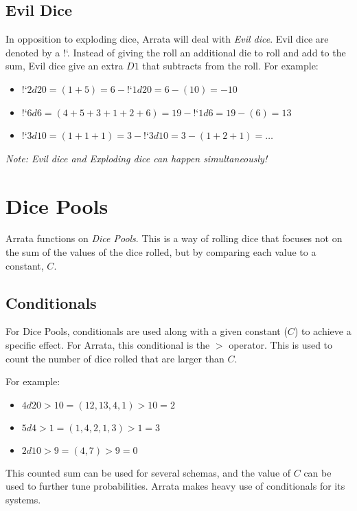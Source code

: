 \documentclass[../main.tex]{subfiles}
\begin{document}
    \subsection{Evil Dice}

    In opposition to exploding dice, Arrata will deal with {\em Evil dice}. Evil dice are denoted by a !`. Instead of giving the roll an additional die to roll and add to the sum, Evil dice give an extra $D1$ that subtracts from the roll. For example:

    \begin{itemize}
        \item!`$2d20 = (1 + 5) = 6 - $!`$1d20 = 6 - (10) = -10$
        \item!`$6d6 = (4 + 5 + 3 + 1 + 2 + 6) = 19 - $!`$1d6 = 19 - (6) = 13$
        \item!`$3d10 = (1 + 1 + 1) = 3 - $!`$3d10 = 3 - (1 + 2 + 1) = \dots$
    \end{itemize}

    {\em Note: Evil dice and Exploding dice can happen simultaneously!}

    \section{Dice Pools}

    Arrata functions on {\em Dice Pools}. This is a way of rolling dice that focuses not on the sum of the values of the dice rolled, but by comparing each value to a constant, $C$.

    \subsection{Conditionals}

    For Dice Pools, conditionals are used along with a given constant ($C$) to achieve a specific effect. For Arrata, this conditional is the $>$ operator. This is used to count the number of dice rolled that are larger than $C$.

    For example:

    \begin{itemize}
        \item $4d20>10 = (12, 13, 4, 1)>10 = 2$
        \item $5d4>1 = (1, 4, 2, 1, 3)>1 = 3$
        \item $2d10>9 = (4, 7)>9 = 0$
    \end{itemize}

    This counted sum can be used for several schemas, and the value of $C$ can be used to further tune probabilities. Arrata makes heavy use of conditionals for its systems.
\end{document}
